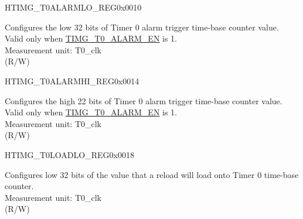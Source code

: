 \begin{register}{H}{TIMG\_T0ALARMLO\_REG}{0x0010}\label{regdesc:TIMGTXALARMLOREG}
%
\regnewline%
\begin{regdesc}\begin{reglist}
\label{fielddesc:TIMGTXALARMLO}\item [TIMG\_T0\_ALARM\_LO] Configures the low 32 bits of Timer 0 alarm trigger time-base counter value. Valid only when \hyperref[fielddesc:TIMGTXALARMEN]{TIMG\_T0\_ALARM\_EN} is 1. \\
Measurement unit: T0\_clk \\
(R/W)
\end{reglist}\end{regdesc}
\end{register}


\begin{register}{H}{TIMG\_T0ALARMHI\_REG}{0x0014}\label{regdesc:TIMGTXALARMHIREG}
%
%
\regnewline%
\begin{regdesc}\begin{reglist}
\label{fielddesc:TIMGTXALARMHI}\item [TIMG\_T0\_ALARM\_HI] Configures the high 22 bits of Timer 0 alarm trigger time-base counter value. Valid only when \hyperref[fielddesc:TIMGTXALARMEN]{TIMG\_T0\_ALARM\_EN} is 1. \\
Measurement unit: T0\_clk \\
(R/W)
\end{reglist}\end{regdesc}
\end{register}


\begin{register}{H}{TIMG\_T0LOADLO\_REG}{0x0018}\label{regdesc:TIMGTXLOADLOREG}
%
\regnewline%
\begin{regdesc}\begin{reglist}
\label{fielddesc:TIMGTXLOADLO}\item [TIMG\_T0\_LOAD\_LO] Configures low 32 bits of the value that a reload will load onto Timer 0 time-base counter. \\
Measurement unit: T0\_clk \\
(R/W)
\end{reglist}\end{regdesc}
\end{register}


